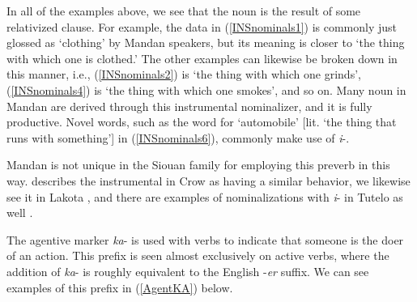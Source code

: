 In all of the examples above, we see that the noun is the result of some relativized clause. For example, the data in (\ref{INSnominals1}) is commonly just glossed as `clothing' by Mandan speakers, but its meaning is closer to `the thing with which one is clothed.' The other examples can likewise be broken down in this manner, i.e., (\ref{INSnominals2}) is `the thing with which one grinds', (\ref{INSnominals4}) is `the thing with which one smokes',  and so on. Many noun in Mandan are derived through this instrumental nominalizer, and it is fully productive. Novel words, such as the word for `automobile' [lit. `the thing that runs with something'] in (\ref{INSnominals6}), commonly make use of \textit{i}-.

Mandan is not unique in the Siouan family for employing this preverb in this way. \citet[48]{graczyk2007} describes the instrumental in Crow as having a similar behavior, we likewise see it in Lakota \citep[440]{ullrichblackbear2016}, and there are examples of nominalizations with \textit{i}- in Tutelo as well \citep[146f]{oliverio1997}.

\label{SubSubSubAgentive}

The agentive marker \textit{ka}- is used with verbs to indicate that someone is the doer of an action. This prefix is seen almost exclusively on active verbs, where the addition of \textit{ka}- is roughly equivalent to the English -\textit{er} suffix. We can see examples of this prefix in (\ref{AgentKA}) below.

